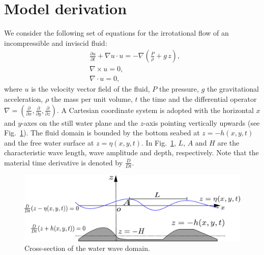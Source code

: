 \section{Model derivation}\label{sec:lopes:modelderivation}
We consider the following set of equations for the
irrotational flow of an incompressible and inviscid fluid:
\begin{subequations}\label{eq:lopes:euler}
\begin{align}
&\displaystyle\frac{\partial u}{\partial t}+\nabla u \cdot
  u=-\nabla\left(\frac{P}{\rho} +g\,
  z\right),\label{eq:lopes:euler-a} \\ &\nabla\times
  u={0},\label{eq:lopes:euler-b}
  \\ &\nabla\cdot{u}=0,\label{eq:lopes:euler-c}
\end{align}
\end{subequations}
where $u$ is the velocity vector field of the fluid, $P$ the
pressure, $g$ the gravitational acceleration, $\rho$ the
mass per unit volume, $t$ the time and the differential
operator
$\nabla=\left(\frac{\partial }{\partial x},\frac{\partial
}{\partial y},\frac{\partial }{\partial z}\right).$ A
Cartesian coordinate system is adopted with the horizontal
$x$ and $y$-axes on the still water plane and the $z$-axis
pointing vertically upwards (see
Fig.~\ref{fig:lopes:schematic}).  The fluid domain is
bounded by the bottom seabed at $z=-h(x,y,t)$ and the free
water surface at $z=\eta(x,y,t)$.
In Fig.~\ref{fig:lopes:schematic}, $L$, $A$ and $H$ are the
characteristic wave length, wave amplitude and depth,
respectively. Note that the material time derivative is
denoted by $\frac{D}{D t}$.
\begin{figure}
\begin{center}
\includegraphics[width=\largefig]{chapters/lopes/pdf/graph.pdf}
\end{center}
\caption{Cross-section of the water wave domain.}
\label{fig:lopes:schematic}
\end{figure}

